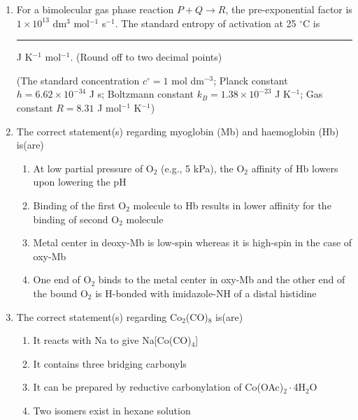 \documentclass[journal,12pt,onecolumn]{IEEEtran}
\theoremstyle{remark}
\begin{document}
\begin{enumerate}
\newpage


\item For a bimolecular gas phase reaction \(P + Q \rightarrow R\), the pre-exponential factor is \(1 \times 10^{13}\) dm\(^3\) mol\(^{-1}\) s\(^{-1}\). The standard entropy of activation at 25 \(^{\circ}\)C is \rule{2cm}{0.15mm} J K\(^{-1}\) mol\(^{-1}\). (Round off to two decimal points)

(The standard concentration \(c^\circ = 1\) mol dm\(^{-3}\); Planck constant \(h = 6.62 \times 10^{-34}\) J s; Boltzmann constant \(k_B = 1.38 \times 10^{-23}\) J K\(^{-1}\); Gas constant \(R = 8.31\) J mol\(^{-1}\) K\(^{-1}\))




\item The correct statement(s) regarding myoglobin (Mb) and haemoglobin (Hb) is(are)
\begin{multicols}{2}
\begin{enumerate}
\item At low partial pressure of O$_2$ (e.g., 5 kPa), the O$_2$ affinity of Hb lowers upon lowering the pH
\item Binding of the first O$_2$ molecule to Hb results in lower affinity for the binding of second O$_2$ molecule
\item Metal center in deoxy-Mb is low-spin whereas it is high-spin in the case of oxy-Mb
\item One end of O$_2$ binds to the metal center in oxy-Mb and the other end of the bound O$_2$ is H-bonded with imidazole-NH of a distal histidine
\end{enumerate}
\end{multicols}

\item The correct statement(s) regarding Co$_2$(CO)$_8$ is(are)
\begin{multicols}{2}
\begin{enumerate}
\item It reacts with Na to give Na[Co(CO)$_4$]
\item It contains three bridging carbonyls
\item It can be prepared by reductive carbonylation of Co(OAc)$_2\cdot$4H$_2$O
\item Two isomers exist in hexane solution
\end{enumerate}
\end{multicols}




\end{enumerate}
\end{document}
